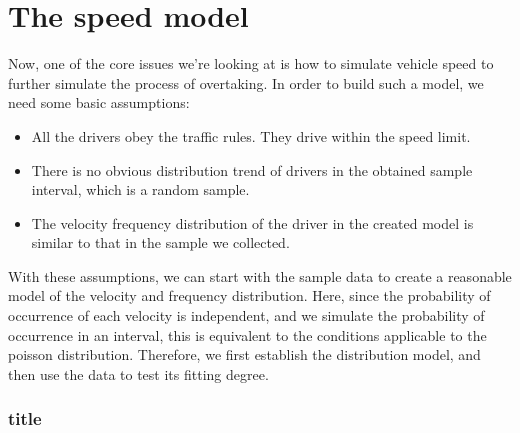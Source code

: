 \section{The speed model}
Now, one of the core issues we're looking at is how to simulate vehicle speed to further simulate the process of overtaking. In order to build such a model, we need some basic assumptions:
\begin{itemize}
	\item All the drivers obey the traffic rules. They drive within the speed limit.
	\item There is no obvious distribution trend of drivers in the obtained sample interval, which is a random sample.
	\item The velocity frequency distribution of the driver in the created model is similar to that in the sample we collected.
\end{itemize}
With these assumptions, we can start with the sample data to create a reasonable model of the velocity and frequency distribution. Here, since the probability of occurrence of each velocity is independent, and we simulate the probability of occurrence in an interval, this is equivalent to the conditions applicable to the poisson distribution. Therefore, we first establish the distribution model, and then use the data to test its fitting degree.
\subsubsection{title}
